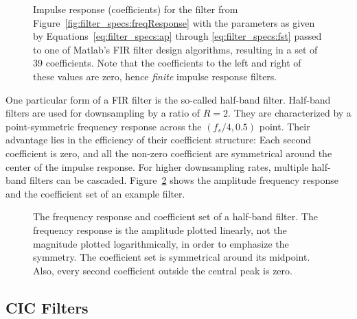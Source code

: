 \begin{figure}
    \centering
    
    \caption[Impulse Response of a FIR Filter]{
        Impulse    response    (coefficients)     for    the    filter    from
        Figure~\ref{fig:filter_specs:freqResponse}    with   the    parameters
        as     given     by     Equations~\ref{eq:filter_specs:ap}     through
        \ref{eq:filter_specs:fst} passed to one  of Matlab's FIR filter design
        algorithms, resulting  in a set  of \num{39} coefficients.   Note that
        the coefficients to the left and right of these values are zero, hence
        \emph{finite} impulse response filters.%
    }
    \label{fig:filter_specs:coefs}
\end{figure}

One   particular  form   of  a   FIR   filter  is   the  so-called   half-band
filter. Half-band  filters   are  used   for  downsampling   by  a   ratio  of
$R=2$.   They  are  characterized  by  a  point-symmetric  frequency  response
across  the $(f_s/4,0.5)$  point. Their advantage  lies in  the efficiency  of
their  coefficient structure: Each  second coefficient  is zero,  and all  the
non-zero  coefficient  are  symmetrical  around  the  center  of  the  impulse
response. For  higher  downsampling  rates,  multiple  half-band  filters  can
be cascaded. Figure~\ref{fig:fir:halfband_linear_example}  shows the amplitude
frequency response and the coefficient set of an example filter.

\begin{figure}
    \centering
    
    \caption[Half-band Filter Frequency Response]{%
        The  frequency response  and coefficient  set of  a half-band  filter.
        The  frequency response  is the  amplitude plotted  linearly, not  the
        magnitude plotted logarithmically, in order to emphasize the symmetry.
        The coefficient  set is  symmetrical around its  midpoint. Also, every
        second coefficient outside the central peak is zero.%
    }
    \label{fig:fir:halfband_linear_example}
\end{figure}
%
%
\clearpage
\subsection{CIC Filters} %
\label{subsec:CIC_filters}

